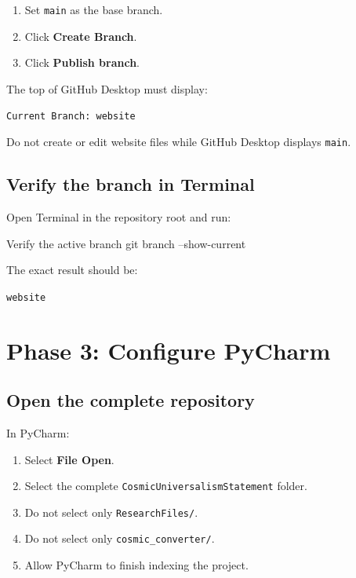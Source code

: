 \documentclass[11pt,letterpaper]{article}
\newcommand{\filepath}[1]{\texttt{#1}}
\newcommand{\menu}[1]{\textbf{\textsf{#1}}}
\newcommand{\branchname}[1]{\texttt{#1}}
\begin{document}
\begin{enumerate}[resume]
    \item Set \branchname{main} as the base branch.
    \item Click \menu{Create Branch}.
    \item Click \menu{Publish branch}.
\end{enumerate}

\begin{checkpointbox}
The top of GitHub Desktop must display:

\begin{center}
\texttt{Current Branch: website}
\end{center}

Do not create or edit website files while GitHub Desktop displays
\branchname{main}.
\end{checkpointbox}

\subsection{Verify the branch in Terminal}

Open Terminal in the repository root and run:

\begin{commandbox}{Verify the active branch}
git branch --show-current
\end{commandbox}

The exact result should be:

\begin{successbox}
\begin{center}
\texttt{website}
\end{center}
\end{successbox}

\section{Phase 3: Configure PyCharm}

\subsection{Open the complete repository}

In PyCharm:

\begin{enumerate}
    \item Select \menu{File \textrightarrow{} Open}.
    \item Select the complete \filepath{CosmicUniversalismStatement}
          folder.
    \item Do not select only \filepath{ResearchFiles/}.
    \item Do not select only \filepath{cosmic\_converter/}.
    \item Allow PyCharm to finish indexing the project.
\end{enumerate}
\end{document}
